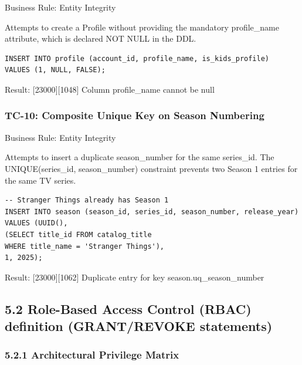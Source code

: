 Business Rule: Entity Integrity

Attempts to create a Profile without providing the mandatory profile\_\allowbreak{}name attribute, which is declared NOT NULL in the DDL.

\begin{lstlisting}[style=reportsql,title={Verification SQL}]
INSERT INTO profile (account_id, profile_name, is_kids_profile)
VALUES (1, NULL, FALSE);
\end{lstlisting}



 \textbullet{} Result: {[}23000{]}{[}1048{]} Column \textquotesingle profile\_\allowbreak{}name\textquotesingle{} cannot be null

\subsubsection{\texorpdfstring{\textbullet{} \textbf{TC-10: Composite Unique Key on Season Numbering}}{\textbullet{} TC-10: Composite Unique Key on Season Numbering}}\label{tc-10-composite-unique-key-on-season-numbering}

Business Rule: Entity Integrity

Attempts to insert a duplicate season\_\allowbreak{}number for the same series\_\allowbreak{}id. The UNIQUE(series\_\allowbreak{}id, season\_\allowbreak{}number) constraint prevents two Season 1 entries for the same TV series.

\begin{lstlisting}[style=reportsql,title={Verification SQL}]
-- Stranger Things already has Season 1
INSERT INTO season (season_id, series_id, season_number, release_year)
VALUES (UUID(),
(SELECT title_id FROM catalog_title
WHERE title_name = 'Stranger Things'),
1, 2025);
\end{lstlisting}



 \textbullet{} Result: {[}23000{]}{[}1062{]} Duplicate entry for key \textquotesingle season.uq\_\allowbreak{}season\_\allowbreak{}number\textquotesingle{}

\subsection*{5.2 Role-Based Access Control (RBAC) definition (GRANT/REVOKE statements)}

\subsubsection{\texorpdfstring{\textbf{5.2.1 Architectural Privilege Matrix}}{5.2.1 Architectural Privilege Matrix}}\label{architectural-privilege-matrix}

